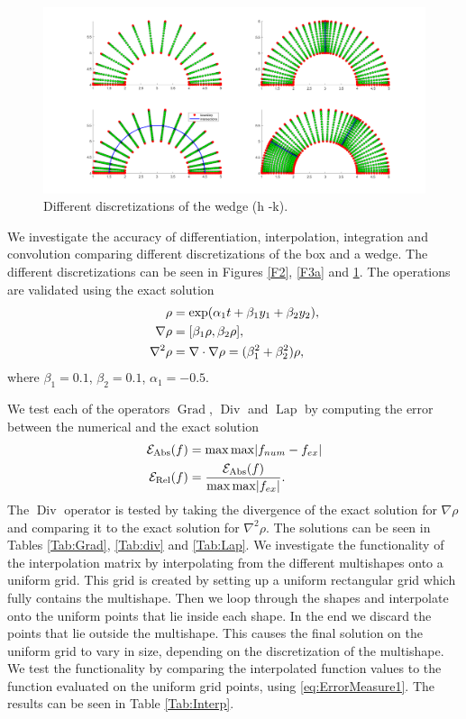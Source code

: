 \documentclass[11pt, a4paper]{article}
\theoremstyle{definition}
\DeclareMathOperator{\Grad}{Grad}
\DeclareMathOperator{\Div}{Div}
\DeclareMathOperator{\Lap}{Lap}
\begin{document}
\begin{figure}[h]
	\centering
	\includegraphics[scale=0.35]{WedgeSections.png}
	\caption{Different discretizations of the wedge (h -k).} 
	\label{F4}
\end{figure}





We investigate the accuracy of differentiation, interpolation, integration and convolution comparing different discretizations of the box and a wedge. The different discretizations can be seen in Figures \ref{F2}, \ref{F3a} and \ref{F4}.
The operations are validated using the exact solution
\begin{align}\label{eq:exactsol1}
	\rho &= \exp( \alpha_1  t + \beta_1 y_1 + \beta_2 y_2),\\
	\nabla \rho &= [\beta_1 \rho, \beta_2 \rho],\notag \\
	\nabla^2 \rho &= \nabla \cdot \nabla \rho = (\beta_1^2 + \beta_2^2)\rho,\notag
\end{align}
where $	\beta_1 = 0.1 $, $\beta_2 = 0.1$, $\alpha_1 = -0.5$.


We test each of the operators $\Grad$, $\Div$ and $\Lap$ by computing the error between the numerical and the exact solution
\begin{align}\label{eq:ErrorMeasure1}
	\mathcal E_{\text{Abs}} (f)&= \max \max \abs{f_{num} - f_{ex}}\\
	\mathcal E_{\text{Rel}} (f)&= \frac{\mathcal E_{\text{Abs}}(f) }{ \max \max \abs{f_{ex}}}.
\end{align}
The $\Div$ operator is tested by taking the divergence of the exact solution for $\nabla \rho$ and comparing it to the exact solution for $\nabla^2 \rho$. The solutions can be seen in Tables \ref{Tab:Grad}, \ref{Tab:div} and \ref{Tab:Lap}.
We investigate the functionality of the interpolation matrix by interpolating from the different multishapes onto a uniform grid. This grid is created by setting up a uniform rectangular grid which fully contains the multishape. Then we loop through the shapes and interpolate onto the uniform points that lie inside each shape. In the end we discard the points that lie outside the multishape. This causes the final solution on the uniform grid to vary in size, depending on the discretization of the multishape. We test the functionality by comparing the interpolated function values to the function evaluated on the uniform grid points, using \eqref{eq:ErrorMeasure1}. The results can be seen in Table \ref{Tab:Interp}.
\end{document}
